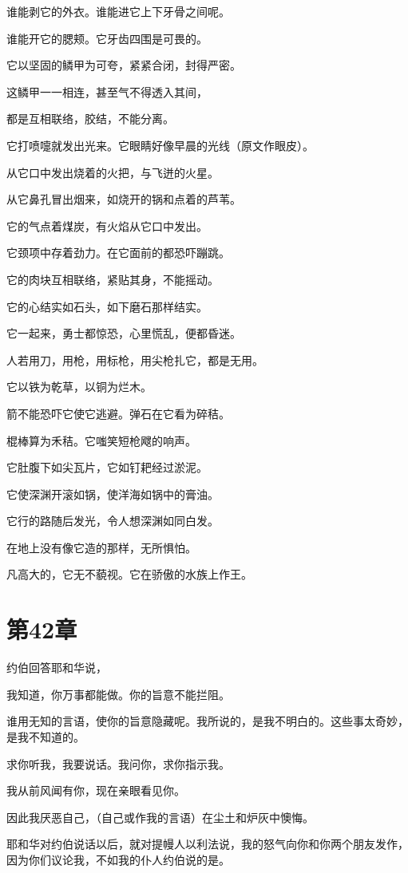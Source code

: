 \documentclass[12pt,oneside]{book}
\begin{document}
谁能剥它的外衣。谁能进它上下牙骨之间呢。

谁能开它的腮颊。它牙齿四围是可畏的。

它以坚固的鳞甲为可夸，紧紧合闭，封得严密。

这鳞甲一一相连，甚至气不得透入其间，

都是互相联络，胶结，不能分离。

它打喷嚏就发出光来。它眼睛好像早晨的光线（原文作眼皮）。

从它口中发出烧着的火把，与飞迸的火星。

从它鼻孔冒出烟来，如烧开的锅和点着的芦苇。

它的气点着煤炭，有火焰从它口中发出。

它颈项中存着劲力。在它面前的都恐吓蹦跳。

它的肉块互相联络，紧贴其身，不能摇动。

它的心结实如石头，如下磨石那样结实。

它一起来，勇士都惊恐，心里慌乱，便都昏迷。

人若用刀，用枪，用标枪，用尖枪扎它，都是无用。

它以铁为乾草，以铜为烂木。

箭不能恐吓它使它逃避。弹石在它看为碎秸。

棍棒算为禾秸。它嗤笑短枪飕的响声。

它肚腹下如尖瓦片，它如钉耙经过淤泥。

它使深渊开滚如锅，使洋海如锅中的膏油。

它行的路随后发光，令人想深渊如同白发。

在地上没有像它造的那样，无所惧怕。

凡高大的，它无不藐视。它在骄傲的水族上作王。


\chapter{第42章}
约伯回答耶和华说，

我知道，你万事都能做。你的旨意不能拦阻。

谁用无知的言语，使你的旨意隐藏呢。我所说的，是我不明白的。这些事太奇妙，是我不知道的。

求你听我，我要说话。我问你，求你指示我。

我从前风闻有你，现在亲眼看见你。

因此我厌恶自己，（自己或作我的言语）在尘土和炉灰中懊悔。

耶和华对约伯说话以后，就对提幔人以利法说，我的怒气向你和你两个朋友发作，因为你们议论我，不如我的仆人约伯说的是。
\end{document}
